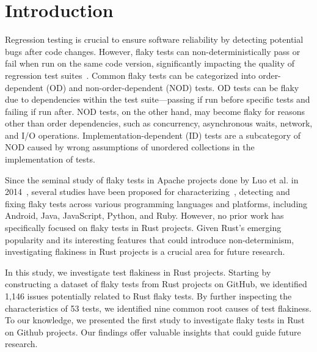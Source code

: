 \section{Introduction}
\label{sec:introduction}
Regression testing is crucial to ensure software reliability by detecting potential bugs after code changes.
However, flaky tests can non-deterministically pass or fail when run on the same code version, significantly impacting the quality of regression test suites~\cite{luo2014empirical}. 
Common flaky tests can be categorized into order-dependent (OD) and non-order-dependent (NOD) tests.
OD tests can be flaky due to dependencies within the test suite—passing if run before specific tests and failing if run after.
NOD tests, on the other hand, may become flaky for reasons other than order dependencies, such as concurrency, asynchronous waits, network, and I/O operations.  
Implementation-dependent (ID) tests are a subcategory of NOD caused by wrong assumptions of unordered collections in the implementation of tests.

Since the seminal study of flaky tests in Apache projects done by Luo et al. in 2014~\cite{luo2014empirical}, several studies have been proposed for characterizing~\cite{thorve2018empirical, gruber2021empirical, gruber2024do, owain2021survey,lam2019root,lam2020study,lam2020large,lam2020understanding,chen2023transforming, hashemi2022empirical, barbosa2022test}, detecting
and fixing
flaky tests across various programming languages and platforms, including Android, Java, JavaScript, Python, and Ruby. However, no prior work has specifically focused on flaky tests in Rust projects. Given Rust's emerging popularity and its interesting features that could introduce non-determinism, investigating flakiness in Rust projects is a crucial area for future research.

In this study, we investigate test flakiness in Rust projects. Starting by constructing a dataset of flaky tests from Rust projects on GitHub, we identified 1,146 issues potentially related to Rust flaky tests.
By further inspecting the characteristics of 53 tests, we identified nine common root causes of test flakiness. To our knowledge, we presented the first study to investigate flaky tests in Rust on Github projects. Our findings offer valuable insights that could guide future research.
